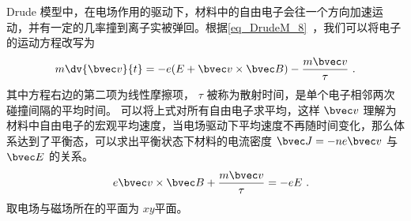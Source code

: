 Drude 模型中，在电场作用的驱动下，材料中的自由电子会往一个方向加速运动，并有一定的几率撞到离子实被弹回。根据\autoref{eq_DrudeM_8}~，我们可以将电子的运动方程改写为
\begin{equation}
m\dv{\bvec v}{t} =  -e(E+\bvec v\times \bvec B)-\frac{m\bvec v}{\tau} ~.
\end{equation}
其中方程右边的第二项为线性摩擦项， $\tau$ 被称为散射时间，是单个电子相邻两次碰撞间隔的平均时间。
可以将上式对所有自由电子求平均，这样 $\bvec v$ 理解为材料中自由电子的宏观平均速度，当电场驱动下平均速度不再随时间变化，那么体系达到了平衡态，可以求出平衡状态下材料的电流密度 $\bvec J=-ne\bvec v$ 与 $\bvec E$ 的关系。
\begin{equation}
\quad e\bvec v\times \bvec B + \frac{m\bvec v}{\tau} = -eE~.
\end{equation}
取电场与磁场所在的平面为 $xy$平面。

